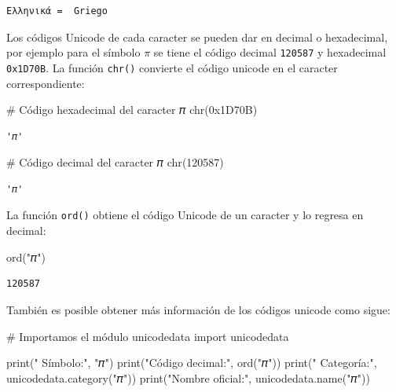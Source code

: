 \documentclass[
  spanish,
  letterpaper,
]{scrbook}
\newenvironment{Shaded}{\begin{snugshade}}{\end{snugshade}}
\newcommand{\BaseNTok}[1]{\textcolor[rgb]{0.68,0.00,0.00}{#1}}
\newcommand{\BuiltInTok}[1]{\textcolor[rgb]{0.00,0.23,0.31}{#1}}
\newcommand{\CommentTok}[1]{\textcolor[rgb]{0.37,0.37,0.37}{#1}}
\newcommand{\DecValTok}[1]{\textcolor[rgb]{0.68,0.00,0.00}{#1}}
\newcommand{\ImportTok}[1]{\textcolor[rgb]{0.00,0.46,0.62}{#1}}
\newcommand{\NormalTok}[1]{\textcolor[rgb]{0.00,0.23,0.31}{#1}}
\newcommand{\StringTok}[1]{\textcolor[rgb]{0.13,0.47,0.30}{#1}}
\theoremstyle{definition}
\theoremstyle{remark}
\begin{document}
\begin{verbatim}
Ελληνικά =  Griego
\end{verbatim}

Los códigos Unicode de cada caracter se pueden dar en decimal o
hexadecimal, por ejemplo para el símbolo \(\pi\) se tiene el código
decimal \texttt{120587} y hexadecimal \texttt{0x1D70B}. La función
\texttt{chr()} convierte el código unicode en el caracter
correspondiente:

\begin{Shaded}
\begin{Highlighting}[]
\CommentTok{\# Código hexadecimal del caracter 𝜋}
\BuiltInTok{chr}\NormalTok{(}\BaseNTok{0x1D70B}\NormalTok{)}
\end{Highlighting}
\end{Shaded}

\begin{verbatim}
'𝜋'
\end{verbatim}

\begin{Shaded}
\begin{Highlighting}[]
\CommentTok{\# Código decimal del caracter 𝜋}
\BuiltInTok{chr}\NormalTok{(}\DecValTok{120587}\NormalTok{)}
\end{Highlighting}
\end{Shaded}

\begin{verbatim}
'𝜋'
\end{verbatim}

La función \texttt{ord()} obtiene el código Unicode de un caracter y lo
regresa en decimal:

\begin{Shaded}
\begin{Highlighting}[]
\BuiltInTok{ord}\NormalTok{(}\StringTok{"𝜋"}\NormalTok{)}
\end{Highlighting}
\end{Shaded}

\begin{verbatim}
120587
\end{verbatim}

También es posible obtener más información de los códigos unicode como
sigue:

\begin{Shaded}
\begin{Highlighting}[]
\CommentTok{\# Importamos el módulo unicodedata}
\ImportTok{import}\NormalTok{ unicodedata }

\BuiltInTok{print}\NormalTok{(}\StringTok{"       Símbolo:"}\NormalTok{, }\StringTok{"𝜋"}\NormalTok{)}
\BuiltInTok{print}\NormalTok{(}\StringTok{"Código decimal:"}\NormalTok{, }\BuiltInTok{ord}\NormalTok{(}\StringTok{"𝜋"}\NormalTok{))}
\BuiltInTok{print}\NormalTok{(}\StringTok{"     Categoría:"}\NormalTok{, unicodedata.category(}\StringTok{"𝜋"}\NormalTok{))}
\BuiltInTok{print}\NormalTok{(}\StringTok{"Nombre oficial:"}\NormalTok{, unicodedata.name(}\StringTok{"𝜋"}\NormalTok{))}
\end{Highlighting}
\end{Shaded}
\end{document}
